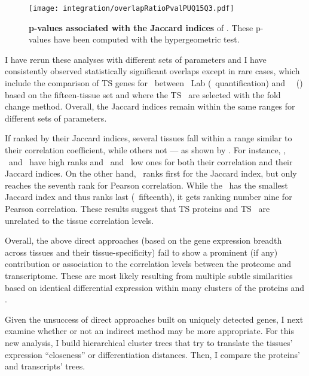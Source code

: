 \begin{figure}[!ht]
    \texttt{[image: integration/overlapRatioPvalPUQ15Q3.pdf]}\centering
    \caption[p-values associated with the Jaccard indices]{%
\label{fig:JaccardPvalues}\label{fig:pJacquard}%
    \textbf{p-values associated with the Jaccard indices} of .
    These p-values have been computed with the hypergeometric test.}
    \vspace{-3mm}
\end{figure}

I have rerun these analyses with different sets of parameters
and I have consistently observed statistically significant overlaps
except in rare cases,
which include the comparison of \gls{TS} genes for \Bladder\
between \pandey\ Lab (\PPKM\ quantification) and \uhlen\ \etal\ (\htseq)
based on the fifteen-tissue set and where the \gls{TS} \mRNAs\ are selected
with the fold change method.
Overall, the Jaccard indices remain within the same ranges
for different sets of parameters.\mybr\

If ranked by their Jaccard indices,
several tissues fall within a range similar to their correlation coefficient,
while others not --- as shown by \Cref{fig:compCorJind}.
For instance, \Liver, \Testis\ and \Pancreas\ have high ranks
and \Bladder\ and \Gallbladder\ low ones
for both their correlation and their Jaccard indices.
On the other hand,
\Kidney\ ranks first for the Jaccard index,
but only reaches the seventh rank for Pearson correlation.
While the \Rectum\ has the smallest Jaccard index
and thus ranks last (\ie\ fifteenth),
it gets ranking number nine for Pearson correlation.
These results suggest that
\gls{TS} proteins and \gls{TS} \mRNAs\ are unrelated to
the tissue correlation levels.\mybr\

Overall, the above direct approaches
(based on the gene expression breadth across tissues and their tissue-specificity)
fail to show a prominent (if any) contribution or association
to the correlation levels between the proteome and transcriptome.
These are most likely resulting
from multiple subtle similarities
based on identical differential expression
within many clusters of the proteins and \mRNAs{}.\mybr\

Given the unsuccess of direct approaches built on uniquely detected genes,
I next examine whether or not an indirect method may be more appropriate.
For this new analysis,
I build hierarchical cluster trees that try to translate
the tissues' expression \enquote{closeness} or differentiation distances.
Then, I compare the proteins' and transcripts' trees.\mybr\

